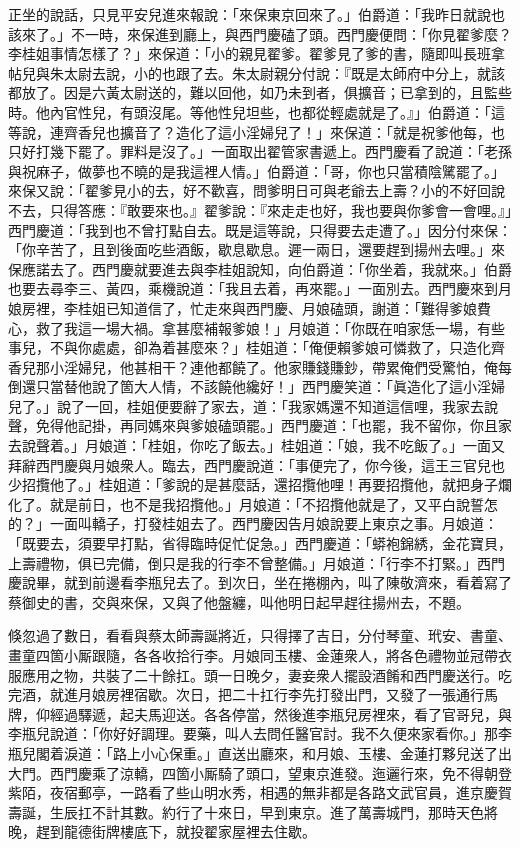 正坐的說話，只見平安兒進來報說：「來保東京回來了。」伯爵道：「我昨日就說也該來了。」不一時，來保進到廳上，與西門慶磕了頭。西門慶便問：「你見翟爹麼？李桂姐事情怎樣了？」來保道：「小的親見翟爹。翟爹見了爹的書，隨即叫長班拿帖兒與朱太尉去說，小的也跟了去。朱太尉親分付說：『既是太師府中分上，就該都放了。因是六黃太尉送的，難以回他，如乃未到者，俱擴音；已拿到的，且監些時。他內官性兒，有頭沒尾。等他性兒坦些，也都從輕處就是了。』」伯爵道：「這等說，連齊香兒也擴音了？造化了這小淫婦兒了！」來保道：「就是祝爹他每，也只好打幾下罷了。罪料是沒了。」一面取出翟管家書遞上。西門慶看了說道：「老孫與祝麻子，做夢也不曉的是我這裡人情。」伯爵道：「哥，你也只當積陰騭罷了。」來保又說：「翟爹見小的去，好不歡喜，問爹明日可與老爺去上壽？小的不好回說不去，只得答應：『敢要來也。』翟爹說：『來走走也好，我也要與你爹會一會哩。』」西門慶道：「我到也不曾打點自去。既是這等說，只得要去走遭了。」因分付來保：「你辛苦了，且到後面吃些酒飯，歇息歇息。遲一兩日，還要趕到揚州去哩。」來保應諾去了。西門慶就要進去與李桂姐說知，向伯爵道：「你坐着，我就來。」伯爵也要去尋李三、黃四，乘機說道：「我且去着，再來罷。」一面別去。西門慶來到月娘房裡，李桂姐已知道信了，忙走來與西門慶、月娘磕頭，謝道：「難得爹娘費心，救了我這一場大禍。拿甚麼補報爹娘！」{}月娘道：「你既在咱家恁一場，有些事兒，不與你處處，卻為着甚麼來？」桂姐道：「俺便賴爹娘可憐救了，只造化齊香兒那小淫婦兒，他甚相干？連他都饒了。他家賺錢賺鈔，帶累俺們受驚怕，俺每倒還只當替他說了箇大人情，不該饒他纔好！」{}西門慶笑道：「眞造化了這小淫婦兒了。」說了一回，桂姐便要辭了家去，道：「我家媽還不知道這信哩，我家去說聲，免得他記掛，再同媽來與爹娘磕頭罷。」西門慶道：「也罷，我不留你，你且家去說聲着。」月娘道：「桂姐，你吃了飯去。」桂姐道：「娘，我不吃飯了。」一面又拜辭西門慶與月娘衆人。臨去，西門慶說道：「事便完了，你今後，這王三官兒也少招攬他了。」{}{}桂姐道：「爹說的是甚麼話，還招攬他哩！再要招攬他，就把身子爛化了。就是前日，也不是我招攬他。」{}月娘道：「不招攬他就是了，又平白說誓怎的？」一面叫轎子，打發桂姐去了。西門慶因告月娘說要上東京之事。月娘道：「既要去，須要早打點，省得臨時促忙促急。」西門慶道：「蟒袍錦綉，金花寶貝，上壽禮物，俱已完備，倒只是我的行李不曾整備。」月娘道：「行李不打緊。」西門慶說畢，就到前邊看李瓶兒去了。到次日，坐在捲棚內，叫了陳敬濟來，看着寫了蔡御史的書，交與來保，又與了他盤纏，叫他明日起早趕往揚州去，不題。

倏忽過了數日，看看與蔡太師壽誕將近，只得擇了吉日，分付琴童、玳安、書童、畫童四箇小厮跟隨，各各收拾行李。月娘同玉樓、金蓮衆人，將各色禮物並冠帶衣服應用之物，共裝了二十餘扛。頭一日晚夕，妻妾衆人擺設酒餚和西門慶送行。吃完酒，就進月娘房裡宿歇。次日，把二十扛行李先打發出門，又發了一張通行馬牌，仰經過驛遞，起夫馬迎送。各各停當，然後進李瓶兒房裡來，看了官哥兒，與李瓶兒說道：「你好好調理。要藥，叫人去問任醫官討。我不久便來家看你。」那李瓶兒閣着淚道：「路上小心保重。」直送出廳來，和月娘、玉樓、金蓮打夥兒送了出大門。西門慶乘了涼轎，四箇小厮騎了頭口，望東京進發。迤邐行來，免不得朝登紫陌，夜宿郵亭，{}一路看了些山明水秀，相遇的無非都是各路文武官員，進京慶賀壽誕，生辰扛不計其數。約行了十來日，早到東京。進了萬壽城門，那時天色將晚，趕到龍德街牌樓底下，就投翟家屋裡去住歇。

